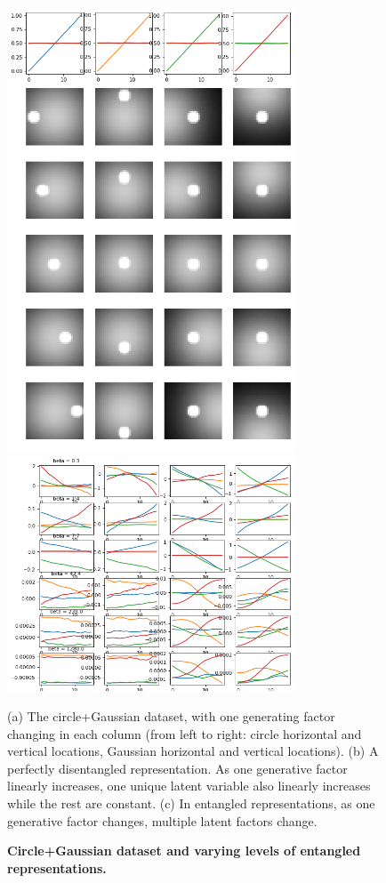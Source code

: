 \documentclass[10pt,letterpaper]{article}
\begin{document}
\begin{figure}%
     \includegraphics[width=3.375in]{entangle_analysis_supervised_anddata.png}
     \includegraphics[width=3.375in]{entangle_analysis_betaVAE.png}
  \caption{\textbf{Circle+Gaussian dataset and varying levels of entangled representations.}}{(a) The circle+Gaussian dataset, with one generating factor changing in each column (from left to right: circle horizontal and vertical locations, Gaussian horizontal and vertical locations). (b) A perfectly disentangled representation. As one generative factor linearly increases, one unique latent variable also linearly increases while the rest are constant. (c) In entangled representations, as one generative factor changes, multiple latent factors change.}
  \label{fig:dataset}
\end{figure}
\end{document}
